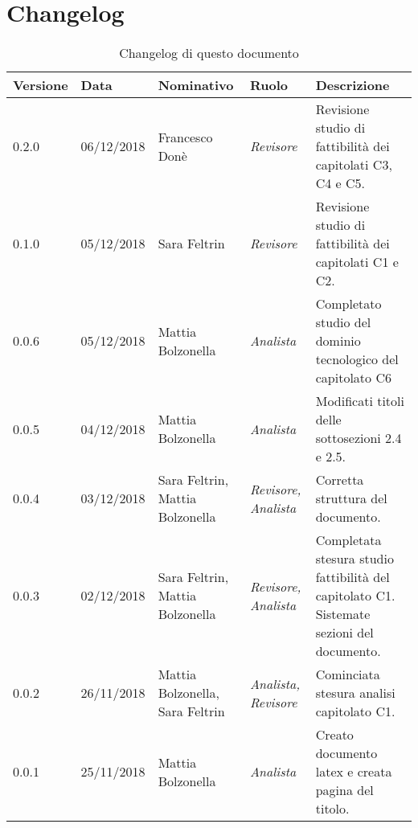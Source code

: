\section*{Changelog}
\begin{table}[tbph]
        \centering
        \begin{tabularx}{\textwidth}{|l|l|l|l|X|}
                \hline
                \textbf{Versione} & \textbf{Data} & \textbf{Nominativo}  & \textbf{Ruolo} & 
                \textbf{Descrizione}\\
                \hline \hline
              	0.2.0 & 06/12/2018 & Francesco Donè & \textit{Revisore} & 
              	Revisione studio di fattibilità dei capitolati C3, C4 e C5.\\
                
                \hline
                0.1.0 & 05/12/2018 & Sara Feltrin & \textit{Revisore} & 
                Revisione studio di fattibilità dei capitolati C1 e C2.\\
              
                \hline
                0.0.6 & 05/12/2018 & Mattia Bolzonella & \textit{Analista} & 
                Completato studio del dominio tecnologico del capitolato C6\\
                
                \hline
                0.0.5 & 04/12/2018 & Mattia Bolzonella & \textit{Analista} & 
                Modificati titoli delle sottosezioni 2.4 e 2.5. \\
                
                \hline
                0.0.4 & 03/12/2018 & Sara Feltrin, Mattia Bolzonella 
                & \textit{Revisore, Analista} & Corretta struttura del documento. \\
                
                \hline
                0.0.3 & 02/12/2018 & Sara Feltrin, Mattia Bolzonella & \textit{Revisore, Analista}
                & Completata stesura studio fattibilità del capitolato C1.
                Sistemate sezioni del documento. \\
                
                \hline
                0.0.2 & 26/11/2018 & Mattia Bolzonella, Sara Feltrin & \textit{Analista, Revisore}
                & Cominciata stesura analisi capitolato C1.\\

                \hline
                0.0.1 & 25/11/2018 & Mattia Bolzonella & \textit{Analista}
                & Creato documento latex e creata pagina del titolo.\\
                
                \hline
                
        \end{tabularx}
        \caption{Changelog di questo documento}
\end{table}